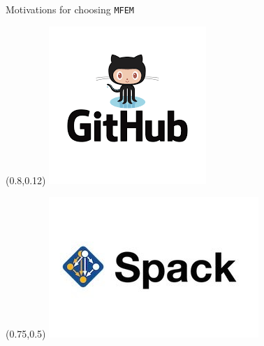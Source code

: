 \documentclass{beamer}
\begin{document}
\begin{frame}[fragile]{Motivations for choosing \texttt{MFEM} }
\begin{textblock}{.19}(0.8,0.12)
    \includegraphics[width=\textwidth]{img/github.png}
\end{textblock}

\begin{textblock}{.24}(0.75,0.5)
    \includegraphics[trim = 0cm 1.5cm 0cm 1.5cm,clip,width=\textwidth]{img/spack.jpg}
\end{textblock}

\end{frame}
\end{document}
